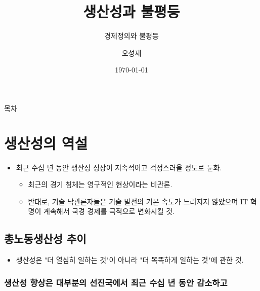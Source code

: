 \documentclass[aspectratio=169,xcolor=dvipsnames,handout]{beamer}
\title[생산성과 불평등]{생산성과 불평등} %
\subtitle{경제정의와 불평등}
\author[오성재]{오성재}
\institute[HNU] %
{
    한남대학교 \\
    탈메이지 교양학부 \\
}
\date{\today} %
\begin{document}
\begin{frame}
    \titlepage
\end{frame}

\begin{frame}{목차}
    \tableofcontents
\end{frame}

\section{생산성의 역설}

\begin{frame}{}
    \begin{itemize}
        \item 최근 수십 년 동안 생산성 성장이 지속적이고 걱정스러울 정도로 둔화.
        \begin{itemize}
            \item 최근의 경기 침체는 영구적인 현상이라는 비관론.
            \item 반대로, 기술 낙관론자들은 기술 발전의 기본 속도가 느려지지 않았으며 IT 혁명이 계속해서 국경 경제를 극적으로 변화시킬 것.
        \end{itemize}
    \end{itemize}
\end{frame}

\subsection{총노동생산성 추이}

\begin{frame}{}
    \begin{itemize}
        \item  생산성은 "더 열심히 일하는 것"이 아니라 "더 똑똑하게 일하는 것"에 관한 것.
    \end{itemize}
\end{frame}

\subsubsection{ 생산성 향상은 대부분의 선진국에서 최근 수십 년 동안 감소하고 }
\end{document}
